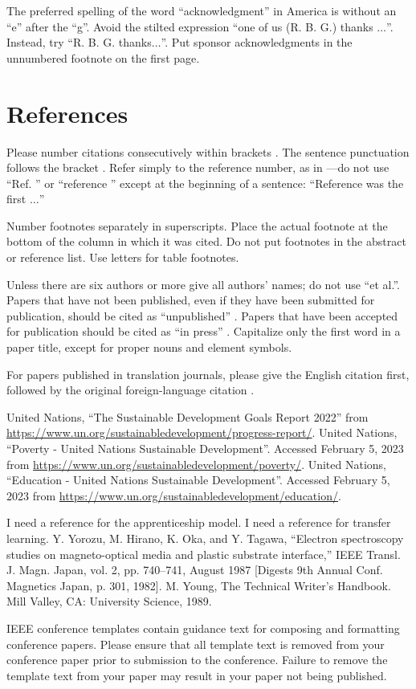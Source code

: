 \documentclass[journal, onecolumn]{IEEEtran}
\begin{document}
The preferred spelling of the word ``acknowledgment'' in America is without 
an ``e'' after the ``g''. Avoid the stilted expression ``one of us (R. B. 
G.) thanks $\ldots$''. Instead, try ``R. B. G. thanks$\ldots$''. Put sponsor 
acknowledgments in the unnumbered footnote on the first page.

\section*{References}

Please number citations consecutively within brackets \cite{b1}. The 
sentence punctuation follows the bracket \cite{b2}. Refer simply to the reference 
number, as in \cite{b3}---do not use ``Ref. \cite{b3}'' or ``reference \cite{b3}'' except at 
the beginning of a sentence: ``Reference \cite{b3} was the first $\ldots$''

Number footnotes separately in superscripts. Place the actual footnote at 
the bottom of the column in which it was cited. Do not put footnotes in the 
abstract or reference list. Use letters for table footnotes.

Unless there are six authors or more give all authors' names; do not use 
``et al.''. Papers that have not been published, even if they have been 
submitted for publication, should be cited as ``unpublished'' \cite{b4}. Papers 
that have been accepted for publication should be cited as ``in press'' \cite{b5}. 
Capitalize only the first word in a paper title, except for proper nouns and 
element symbols.

For papers published in translation journals, please give the English 
citation first, followed by the original foreign-language citation \cite{b6}.

\begin{thebibliography}{00}
   United Nations, ``The Sustainable Development Goals Report 2022'' from \url{https://www.un.org/sustainabledevelopment/progress-report/}.
   United Nations, ``Poverty - United Nations Sustainable Development''. Accessed February 5, 2023 from \url{https://www.un.org/sustainabledevelopment/poverty/}.
   United Nations, ``Education - United Nations Sustainable Development''. Accessed February 5, 2023 from \url{https://www.un.org/sustainabledevelopment/education/}.

  
 I need a reference for the apprenticeship model.
 I need a reference for transfer learning.
 Y. Yorozu, M. Hirano, K. Oka, and Y. Tagawa, ``Electron spectroscopy studies on magneto-optical media and plastic substrate interface,'' IEEE Transl. J. Magn. Japan, vol. 2, pp. 740--741, August 1987 [Digests 9th Annual Conf. Magnetics Japan, p. 301, 1982].
 M. Young, The Technical Writer's Handbook. Mill Valley, CA: University Science, 1989.
\end{thebibliography}
\vspace{12pt}
\color{red}
IEEE conference templates contain guidance text for composing and formatting conference papers. Please ensure that all template text is removed from your conference paper prior to submission to the conference. Failure to remove the template text from your paper may result in your paper not being published.
\end{document}
